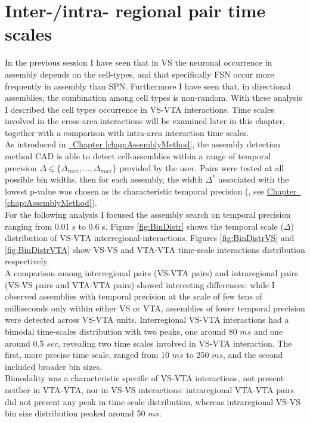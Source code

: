 \section{Inter-/intra- regional pair time scales}
\label{sec:TimeScales}
In the previous session I have seen that in VS the neuronal occurrence in assembly depends on the cell-types, and that specifically FSN occur more frequently in assembly than SPN. Furthermore I have seen that, in directional assemblies, the combination among cell types is non-random. With these analysis I described the cell types occurrence in VS-VTA interactions. Time scales involved in the cross-area interactions will be examined later in this chapter, together with a comparison with intra-area interaction time scales.\\As introduced in \hyperref[chap:AssemblyMethod]{~Chapter \ref*{chap:AssemblyMethod}}, the assembly detection method CAD is able to detect cell-assemblies within a range of temporal precision $\Delta\in\{\Delta_{min},...,\Delta_{max}\}$ provided by the user. Pairs were tested at all possible bin widths, then for each assembly, the width $\Delta^*$ associated with the lowest p-value was chosen as its characteristic temporal precision (\cite{RussoDurstewitz}, see \hyperref[chap:AssemblyMethod]{Chapter~ \ref*{chap:AssemblyMethod}}).\\For the following analysis I focused the assembly search on temporal precision ranging from 0.01 s to 0.6 s. Figure \ref{fig:BinDistr} shows the temporal scale ($\Delta$) distribution of VS-VTA interregional-interactions. Figures \ref{fig:BinDistrVS} and \ref{fig:BinDistrVTA} show VS-VS and VTA-VTA time-scale interactions distribution respectively.\\A comparison among interregional pairs (VS-VTA pairs) and intraregional pairs (VS-VS pairs and VTA-VTA pairs) showed interesting differences: while I observed assemblies with temporal precision at the scale of few tens of milliseconds only within either VS or VTA, assemblies of lower temporal precision were detected across VS-VTA units. Interregional VS-VTA interactions had a bimodal time-scales distribution with two peaks, one around 80 $ms$ and one around 0.5 $sec$, revealing two time scales involved in VS-VTA interaction. The first, more precise time scale, ranged from 10 $ms$ to 250 $ms$, and the second included broader bin sizes.\\Bimodality was a characteristic specific of VS-VTA interactions, not present neither in VTA-VTA, nor in VS-VS interactions: intraregional VTA-VTA pairs did not present any peak in time scale distribution, whereas intraregional VS-VS bin size distribution peaked around 50 $ms$.  
